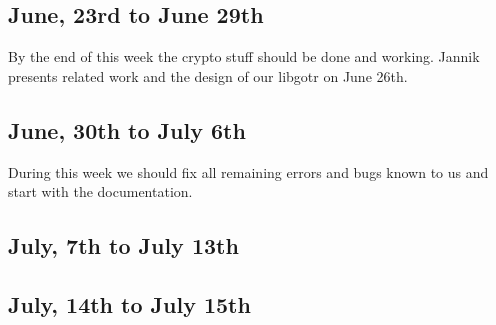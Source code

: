 \subsection{June, 23rd to June 29th}

By the end of this week the crypto stuff should be done and working. Jannik
presents related work and the design of our libgotr on June 26th.

\subsection{June, 30th to July 6th}

During this week we should fix all remaining errors and bugs known to us and
start with the documentation.

\subsection{July, 7th to July 13th}



\subsection{July, 14th to July 15th}




